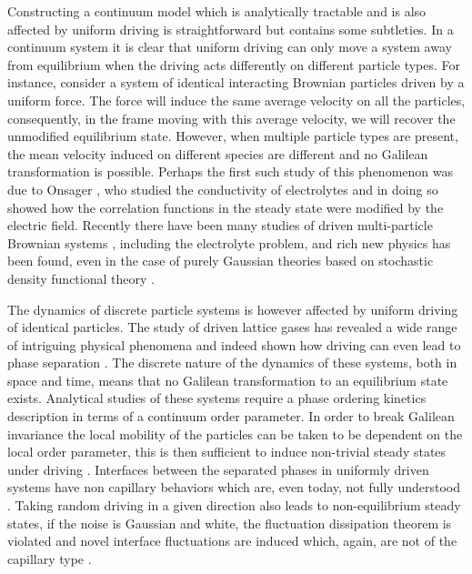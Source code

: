 Constructing a continuum model which is analytically tractable and is also affected by uniform driving is straightforward but contains some subtleties. In a continuum system it is clear that uniform driving can only move a system away from equilibrium when the driving acts differently on different particle types. For instance, consider  a system of identical interacting Brownian particles driven by a uniform  force. The force will induce the same average velocity on all the particles, consequently, in the frame moving with this average velocity, we will recover the unmodified equilibrium state. However, when multiple particle types are present, the mean velocity induced on different species are different and no Galilean transformation is possible. Perhaps the first such study of this phenomenon was due to Onsager \cite{lars_onsager_collected_1996}, who studied the conductivity of electrolytes and in doing so showed how the correlation functions in the steady state were modified by the electric field. 
Recently there have been many studies of driven multi-particle Brownian systems \cite{dzubiella_lane_2002,chakrabarti_dynamical_2003,chakrabarti_reentrance_2004,sutterlin_dynamics_2009,glanz_nature_2012, klymko_microscopic_2016}, including the electrolyte problem,  and rich new physics has been found, even in the case of purely Gaussian theories \cite{demery_conductivity_2016,poncet_universal_2017} based on stochastic density functional theory \cite{dean_renormalization_1996}. 

The dynamics of discrete particle systems is however affected by uniform driving of identical particles. The study of driven lattice gases has revealed a wide range of intriguing physical phenomena and indeed shown how driving can even lead to phase separation \cite{katz_nonequilibrium_1984,zia_interfacial_1991,leung_anomalous_1993,schmittmann_driven_1998}. The discrete nature of the dynamics of these systems, both in space and time, means that no Galilean transformation to an equilibrium state exists. Analytical studies of these systems require a phase ordering kinetics description in terms of a continuum order parameter. In order to break Galilean invariance the local mobility of the particles can be taken to be dependent on the local order parameter, this is then sufficient to induce non-trivial steady states under driving \cite{katz_nonequilibrium_1984,leung_anomalous_1993,smith_interfaces_2008,smith_lateral_2010}. Interfaces between the separated phases in uniformly driven systems have non capillary behaviors which are, even today, not fully understood \cite{leung_anomalous_1993}.
Taking random driving in a given direction also leads to non-equilibrium steady states, if the noise is Gaussian and white, the fluctuation dissipation theorem is violated and novel interface fluctuations are induced which, again, are  not of  the capillary type \cite{zia_interfacial_1991}. 

